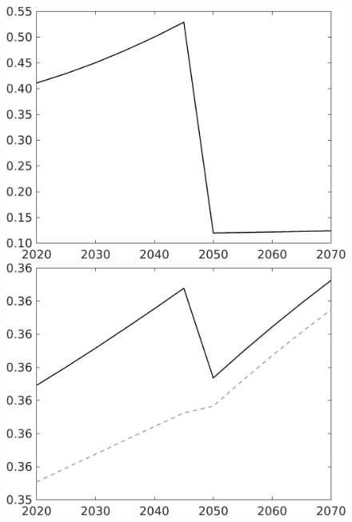 \begin{figure}[h!!!]
\begin{minipage}[]{0.32\textwidth}
	\end{minipage}
	\begin{minipage}[]{0.32\textwidth}
		\includegraphics[width=1\textwidth]{../../codding_model/own_basedOnFried/optimalPol_010922_revision/figures/all_13Sept22_Tplus30/hh_OPT_COMPtaulPer_regime4_spillover0_knspil1_noskill1_sep0_xgrowth0_PV1_etaa0.79.png}
	\end{minipage}
	\begin{minipage}[]{0.32\textwidth}
		\includegraphics[width=1\textwidth]{../../codding_model/own_basedOnFried/optimalPol_010922_revision/figures/all_13Sept22_Tplus30/hh_OPT_COMPtaul_regime4_spillover0_knspil1_noskill1_sep0_xgrowth0_PV1_etaa0.79_lgd0.png}
	\end{minipage}
\end{figure} 
